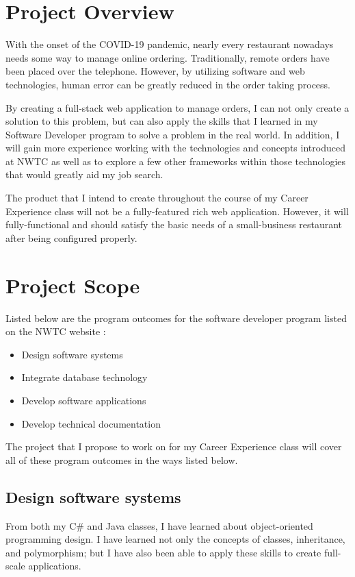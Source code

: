 \documentclass[letterpaper,11pt]{../templates/texMemo}
\begin{document}
    \maketitle


    \section{Project Overview}
    With the onset of the COVID-19 pandemic, nearly every restaurant nowadays needs some way to manage online ordering. Traditionally, remote orders have been placed over the telephone. However, by utilizing software and web technologies, human error can be greatly reduced in the order taking process.

    By creating a full-stack web application to manage orders, I can not only create a solution to this problem, but can also apply the skills that I learned in my Software Developer program to solve a problem in the real world. In addition, I will gain more experience working with the technologies and concepts introduced at NWTC as well as to explore a few other frameworks within those technologies that would greatly aid my job search.

    The product that I intend to create throughout the course of my Career Experience class will not be a fully-featured rich web application. However, it will fully-functional and should satisfy the basic needs of a small-business restaurant after being configured properly.


    \section{Project Scope}
    Listed below are the program outcomes for the software developer program listed on the NWTC website \parencite{nwtc_software_developer_2022}:

    \begin{itemize}
        \item Design software systems
        \item Integrate database technology
        \item Develop software applications
        \item Develop technical documentation
    \end{itemize}

    The project that I propose to work on for my Career Experience class will cover all of these program outcomes in the ways listed below.

    \subsection{Design software systems}
    From both my C\# and Java classes, I have learned about object-oriented programming design. I have learned not only the concepts of classes, inheritance, and polymorphism; but I have also been able to apply these skills to create full-scale applications.
\end{document}
